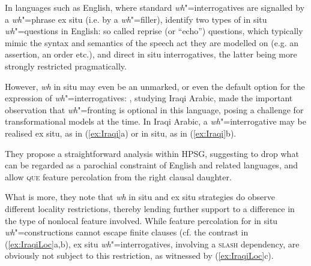 \documentclass[output=paper
	        ,collection
	        ,collectionchapter
 	        ,biblatex
                ,babelshorthands
                ,newtxmath
                ,draftmode
                ,colorlinks, citecolor=brown
]{langscibook}
\begin{document}
{In languages such as English, where standard \emph{wh}"=interrogatives
are signalled by a \emph{wh}"=phrase ex situ (i.e. by a
\emph{wh}"=filler), \citet{Ginzburg:Sag:01} identify two types of in
situ \emph{wh}"=questions in English: so called reprise (or ``echo'')
questions, which typically mimic the syntax and semantics of the
speech act they are modelled on (e.g. an assertion, an order etc.),
and direct in situ interrogatives, the latter being more strongly
restricted
pragmatically. %

However, \emph{wh} in situ may even be an unmarked, or even the default
option for the expression of \emph{wh}"=interrogatives:
\citet{Johnson:Lappin:97}, studying Iraqi Arabic, made the important
observation that \emph{wh}"=fronting is optional in this language,
posing a challenge for transformational models at the time.  In Iraqi
Arabic, a \emph{wh}"=interrogative may be realised ex situ, as in
(\ref{ex:Iraqi}a) or in situ, as in (\ref{ex:Iraqi}b).

\begin{exe}
  \ex \label{ex:Iraqi}
  \begin{xlist}
    
  \end{xlist}

\end{exe}

\noindent
They propose a straightforward analysis within HPSG, suggesting to
drop what can be regarded as a parochial constraint of English and
related languages, and allow \textsc{que} feature percolation from the
right clausal daughter.
 
What is more, they note that \emph{wh} in situ and ex situ strategies
do observe different locality restrictions, thereby lending further
support to a difference in the type of nonlocal feature
involved. While feature percolation for in situ
\emph{wh}"=constructions cannot escape finite clauses (cf. the
contrast in (\ref{ex:IraqiLoc}a,b), ex situ \emph{wh}"=interrogatives,
involving a \textsc{slash} dependency, are obviously not subject to
this restriction, as witnessed by (\ref{ex:IraqiLoc}c).

}
\end{document}
